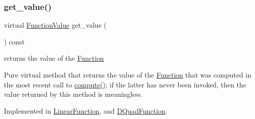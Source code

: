 \mbox{\label{class_s_m_spp__di__unipi__it_1_1_function_a040b4850ae0a23a1c9ff79b497b6eaaf}} 
\subsubsection{\texorpdfstring{get\+\_\+value()}{get\_value()}}
{\footnotesize\ttfamily virtual \mbox{\hyperlink{class_s_m_spp__di__unipi__it_1_1_function_a9ad432406b609e28d340f73e9474bffe}{Function\+Value}} get\+\_\+value (\begin{DoxyParamCaption}\item[{void}]{ }\end{DoxyParamCaption}) const\hspace{0.3cm}{\ttfamily [pure virtual]}}



returns the value of the \mbox{\hyperlink{class_s_m_spp__di__unipi__it_1_1_function}{Function}} 

Pure virtual method that returns the value of the \mbox{\hyperlink{class_s_m_spp__di__unipi__it_1_1_function}{Function}} that was computed in the most recent call to \mbox{\hyperlink{class_s_m_spp__di__unipi__it_1_1_function_a504d4e3e174c7a518cc66156a8a45ce5}{compute()}}; if the latter has never been invoked, then the value returned by this method is meaningless. 

Implemented in \mbox{\hyperlink{class_s_m_spp__di__unipi__it_1_1_linear_function_ae74d8c7f3dc6100820de31198c77ca25}{Linear\+Function}}, and \mbox{\hyperlink{class_s_m_spp__di__unipi__it_1_1_d_quad_function_ae74d8c7f3dc6100820de31198c77ca25}{D\+Quad\+Function}}.

\mbox{\label{class_s_m_spp__di__unipi__it_1_1_function_a61e973f39747f63b8f56d97cc62e32ce}} 
